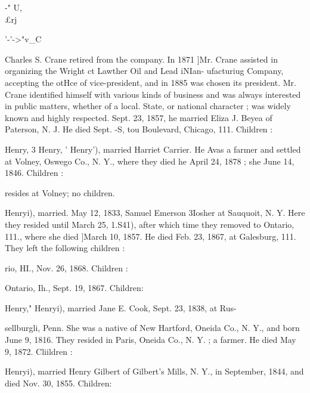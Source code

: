 \documentclass[oneside]{book}
\begin{document}
-" U, \\£rj 



'-'->"v\_C 




Charles S. Crane retired from the company. In 1871 ]Mr. Crane 
assisted in organizing the Wright ct Lawther Oil and Lead iNIan- 
ufacturiug Company, accepting the otHce of vice-president, and 
in 1885 was chosen its president. Mr. Crane identified himself 
with various kinds of business and was always interested in 
public matters, whether of a local. State, or national character ; 
was widely known and highly respected. Sept. 23, 1857, he 
married Eliza J. Beyea of Paterson, N. J. He died Sept. -S, 
tou Boulevard, Chicago, 111. Children : 



Henry, 3 Henry, ' Henry'), married Harriet Carrier. He Avas a 
farmer and settled at Volney, Oswego Co., N. Y., where they 
died he April 24, 1878 ; she June 14, 1846. Children : 

resides at Volney; no children. 


Henryi), married. May 12, 1833, Samuel Emerson 3Iosher at 
Sauquoit, N. Y. Here they resided until March 25, 1.S41), after 
which time they removed to Ontario, 111., where she died ]March 
10, 1857. He died Feb. 23, 1867, at Galesburg, 111. They left 
the following children : 








rio, HI., Nov. 26, 1868. Children : 






Ontario, Ih., Sept. 19, 1867. Children: 












Henry," Henryi), married Jane E. Cook, Sept. 23, 1838, at Rus- 




sellburgli, Penn. She was a native of New Hartford, Oneida 
Co., N. Y., and born June 9, 1816. They resided in Paris, 
Oneida Co., N. Y. ; a farmer. He died May 9, 1872. Cliildren : 




Henryi), married Henry Gilbert of Gilbert's Mills, N. Y., in 
September, 1844, and died Nov. 30, 1855. Children: 
\end{document}
